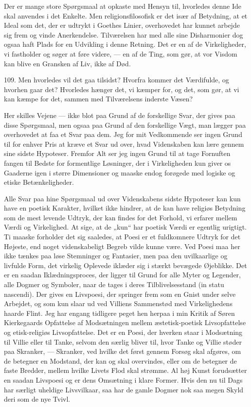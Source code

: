 \documentclass[12pt,a4paper,openany]{book}
\newcommand{\opage}[1]{\marginnote{\footnotesize\textit{[#1]}}}
\begin{document}
Der er mange store Spørgsmaal at opkaste med Hensyn til, hvorledes denne
Ide skal anvendes i det Enkelte. Men religionsfilosofisk er det især af
Betydning, at et Ideal som det, der er udtrykt i Goethes Linier,
overhovedet har kunnet arbejde sig frem og vinde Anerkendelse.
Tilværelsen har med alle sine Disharmonier dog ogsaa haft Plads for en
Udvikling i denne Retning. Det er en af de Virkeligheder, vi fastholder
og søger at
\opage{240}føre videre, --- en af de Ting, som gør, at vor Visdom kan
blive en Gransken af Liv, ikke af Død.

109. Men hvorledes vil det gaa tilsidst? Hvorfra kommer det Værdifulde,
og hvorhen gaar det? Hvorledes hænger det, vi kæmper for, og det, som
gør, at vi kan kæmpe for det, sammen med Tilværelsens inderste Væsen?

Her skilles Vejene --- ikke blot paa Grund af de forskellige Svar, der
gives paa disse Spørgsmaal, men ogsaa paa Grund af den forskellige Vægt,
man lægger paa overhovedet at faa et Svar paa dem. Jeg for mit
Vedkommende ser ingen Grund til for enhver Pris at kræve et Svar ud
over, hvad Videnskaben kan lære gennem sine sidste Hypoteser. Fremfor
Alt ser jeg ingen Grund til at tage Fornuften fangen til Bedste for
formentlige Løsninger, der i Virkeligheden kun giver os Gaaderne igen i
større Dimensioner og maaske endog forøgede med logiske og etiske
Betænkeligheder.

Alle Svar paa hine Spørgsmaal ud over Videnskabens sidste Hypoteser kan
kun have en poetisk Karakter, hvilket ikke hindrer, at de kan have
religiøs Betydning som de mest levende Udtryk, der kan findes for det
Forhold, vi erfarer mellem Værdi og Virkelighed. At sige, at de „kun“
har poetisk Værdi er egentlig urigtigt. Ti maaske forholder det sig
saaledes, at Poesi er et fuldkomnere Udtryk for det Højeste, end noget
videnskabeligt Begreb vilde kunne være. Ved Poesi maa her ikke tænkes
paa løse Stemninger og Fantasier, men paa den uvilkaarlige og livfulde
Form, det virkelig Oplevede iklæder sig i stærkt bevægede Øjeblikke. Det
er en saadan Iklædningsproces, der ligger til Grund for alle Myter og
Legender, alle Dogmer og Symboler, naar de tages i deres
Tilblivelsesstand (in statu nascendi). Der gives en Livspoesi, der
springer frem som en Gnist under selve Arbejdet, og som kun slaar ud ved
Villiens Sammenstød med Virkelighedens haarde Flint. Jeg har engang
tidligere peget hen herpaa i min Kritik af Søren Kierkegaards Opfattelse
af Modsætningen mellem æstetisk-poetisk Livsopfattelse og etisk-religiøs
Livsopfattelse. Det er en Poesi, der hverken staar i Modsætning til
Villie eller til Tanke, selvom den særlig bliver til, hvor Tanke og
Villie støder paa Skranker, --- Skranker, ved hvilke det først gennem
Forsøg skal afgøres, om de betegner en Modstand, der kan og skal
overvindes, eller om de betegner de faste Bredder, mellem hvilke Livets
Flod skal strømme. Al høj Kunst forudsætter en saadan Livspoesi og er
dens Omsætning i klare Former. Hvis den nu
\opage{241}til Dags har særligt uheldige Livsvilkaar, saa har de gamle
Dogmer nok saa megen Skyld deri som de nye Tvivl.
\end{document}
